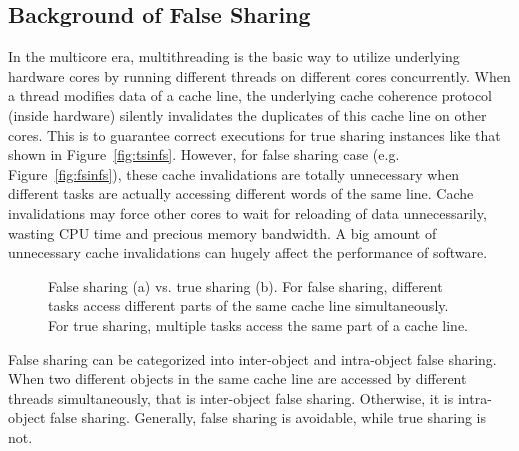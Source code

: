 \label{sec:overview}

\subsection{Background of False Sharing}
\label{sec:background}

In the multicore era, multithreading is the basic way to utilize underlying hardware cores by running different threads on different cores concurrently. When a thread modifies data of a cache line, the underlying cache coherence protocol (inside hardware) silently invalidates the duplicates of this cache line on other cores. This is to guarantee correct executions for true sharing instances like that shown in Figure~\ref{fig:tsinfs}. However, for false sharing case (e.g. Figure~\ref{fig:fsinfs}), these cache invalidations are totally unnecessary when different tasks are actually accessing different words of the same line. Cache invalidations may force other cores to wait for reloading of data unnecessarily, wasting CPU time and precious memory bandwidth. A big amount of unnecessary cache invalidations can hugely affect the performance of software. %

\begin{figure}[htbp]
\centering
{}%
\hspace{30pt}
%
\caption{False sharing (a) vs. true sharing (b). For false sharing, different tasks access different parts of the same cache line simultaneously. For true sharing, multiple tasks access the same part of a cache line.\label{fig:falsesharing}}
\end{figure}

False sharing can be categorized into inter-object and intra-object false sharing. When two different objects in the same cache line are accessed by different threads simultaneously, that is inter-object false sharing. Otherwise, it is intra-object false sharing. Generally, false sharing is avoidable, while true sharing is not. 


